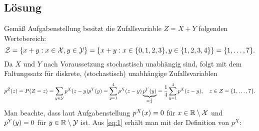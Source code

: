 \documentclass{exercise}
\begin{document}
    \subsection*{Lösung}
    Gemäß Aufgabenstellung besitzt die Zufallsvariable \(Z = X + Y\) folgenden Wertebereich:
    \[
        \mathcal{Z} = \braces*{x + y : x \in \mathcal{X}, y \in \mathcal{Y}} = \braces*{x + y : x \in \braces*{0, 1, 2, 3}, y \in \braces*{1, 2, 3, 4}} = \braces*{1, \ldots, 7}.
    \]
    Da \(X\) und \(Y\) nach Voraussetzung stochastisch unabhängig sind, folgt mit dem Faltungssatz für diskrete, (stochastisch) unabhängige Zufallsvariablen
    \begin{equation}\label{eq:1}
        p^Z\parentheses*{z} = P\parentheses*{Z = z} = \sum_{y \in \mathcal{Y}}p^X\parentheses*{z - y}p^Y\parentheses*{y} = \sum_{y = 1}^4 p^X\parentheses*{z - y}\underbrace{p^Y\parentheses*{y}}_{= \frac{1}{4}} = \frac{1}{4}\sum_{y = 1}^4 p^X\parentheses*{z - y}, \quad z \in \mathcal{Z} = \braces*{1, \ldots, 7}.
    \end{equation}
    Man beachte, dass laut Aufgabenstellung \(p^X\parentheses*{x} = 0\) für \(x \in \mathbb{R} \setminus \mathcal{X}\) und \(p^Y\parentheses*{y} = 0\) für \(y \in \mathbb{R} \setminus \mathcal{Y}\) ist.
    Aus \eqref{eq:1} erhält man mit der Definition von \(p^X\):
\end{document}
